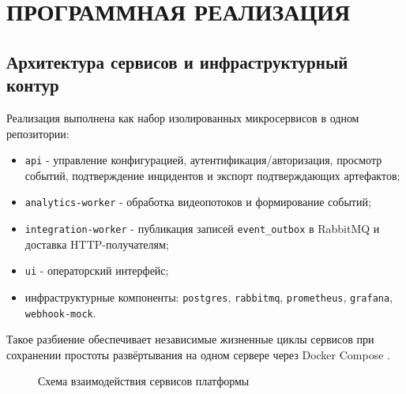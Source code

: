 \chapter{ПРОГРАММНАЯ РЕАЛИЗАЦИЯ}
\label{ch:implementation}

\section{Архитектура сервисов и инфраструктурный контур}

Реализация выполнена как набор изолированных микросервисов в одном репозитории:
\begin{itemize}
    \item \texttt{api} - управление конфигурацией, аутентификация/авторизация, просмотр событий, подтверждение инцидентов и экспорт подтверждающих артефактов;
    \item \texttt{analytics-worker} - обработка видеопотоков и формирование событий;
    \item \texttt{integration-worker} - публикация записей \texttt{event\_outbox} в RabbitMQ и доставка HTTP-получателям;
    \item \texttt{ui} - операторский интерфейс;
    \item инфраструктурные компоненты: \texttt{postgres}, \texttt{rabbitmq}, \texttt{prometheus}, \texttt{grafana}, \texttt{webhook-mock}.
\end{itemize}

Такое разбиение обеспечивает независимые жизненные циклы сервисов при сохранении простоты развёртывания на одном сервере через Docker Compose \cite{docker_docs,rabbitmq_docs,postgresql_docs}.

\begin{figure}[H]
\centering
{}
\caption{Схема взаимодействия сервисов платформы}
\label{fig:service_architecture_scheme}
\end{figure}

